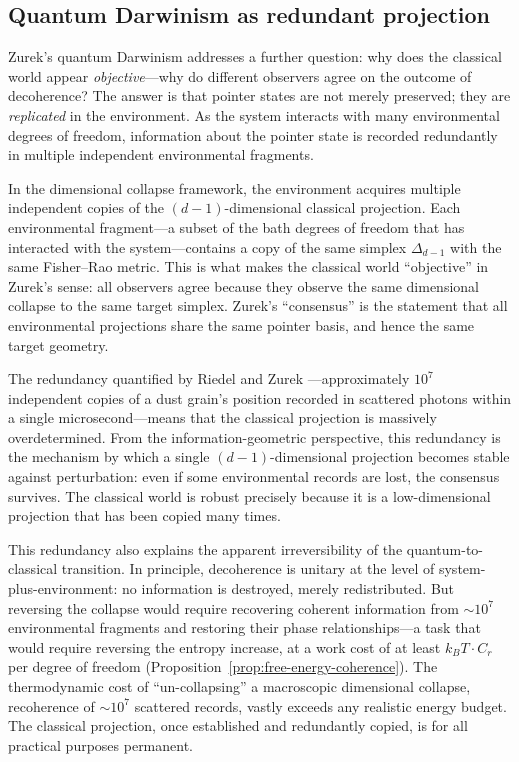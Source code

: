 \documentclass[12pt,a4paper]{article}
\theoremstyle{definition}
\theoremstyle{remark}
\begin{document}
\subsection{Quantum Darwinism as redundant projection}
\label{sec:darwinism}

Zurek's quantum Darwinism \cite{zurek2003decoherence,zurek2025decoherence,riedel2010zurek} addresses a further question: why does the classical world appear \emph{objective}---why do different observers agree on the outcome of decoherence?  The answer is that pointer states are not merely preserved; they are \emph{replicated} in the environment.  As the system interacts with many environmental degrees of freedom, information about the pointer state is recorded redundantly in multiple independent environmental fragments.

In the dimensional collapse framework, the environment acquires multiple independent copies of the $(d-1)$-dimensional classical projection.  Each environmental fragment---a subset of the bath degrees of freedom that has interacted with the system---contains a copy of the same simplex $\Delta_{d-1}$ with the same Fisher--Rao metric.  This is what makes the classical world ``objective'' in Zurek's sense: all observers agree because they observe the same dimensional collapse to the same target simplex.  Zurek's ``consensus'' is the statement that all environmental projections share the same pointer basis, and hence the same target geometry.

The redundancy quantified by Riedel and Zurek \cite{riedel2010zurek}---approximately $10^7$ independent copies of a dust grain's position recorded in scattered photons within a single microsecond---means that the classical projection is massively overdetermined.  From the information-geometric perspective, this redundancy is the mechanism by which a single $(d-1)$-dimensional projection becomes stable against perturbation: even if some environmental records are lost, the consensus survives.  The classical world is robust precisely because it is a low-dimensional projection that has been copied many times.

This redundancy also explains the apparent irreversibility of the quantum-to-classical transition.  In principle, decoherence is unitary at the level of system-plus-environment: no information is destroyed, merely redistributed.  But reversing the collapse would require recovering coherent information from $\sim\!10^7$ environmental fragments and restoring their phase relationships---a task that would require reversing the entropy increase, at a work cost of at least $k_B T \cdot C_r$ per degree of freedom (Proposition~\ref{prop:free-energy-coherence}).  The thermodynamic cost of ``un-collapsing'' a macroscopic dimensional collapse, recoherence of $\sim\!10^7$ scattered records, vastly exceeds any realistic energy budget.  The classical projection, once established and redundantly copied, is for all practical purposes permanent.
\end{document}
